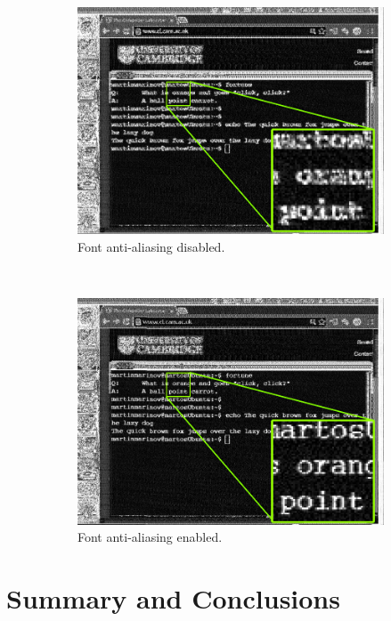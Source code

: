 \documentclass[a4paper,12pt,twoside,openright]{report}
\begin{document}
\begin{figure}[h!]
  \vspace{1cm}
  \begin{subfigure}[b]{0.45\textwidth}
  \includegraphics[width=\textwidth]{antialise_on}
  \caption{Font anti-aliasing disabled.}
\end{subfigure} ~
\begin{subfigure}[b]{0.45\textwidth}
  \includegraphics[width=\textwidth]{antialise_off}
  \caption{Font anti-aliasing enabled.}
\end{subfigure}
  \caption{}
  \label{fig:antialiseonoff}
\end{figure}

\chapter{Summary and Conclusions} 
\end{document}
